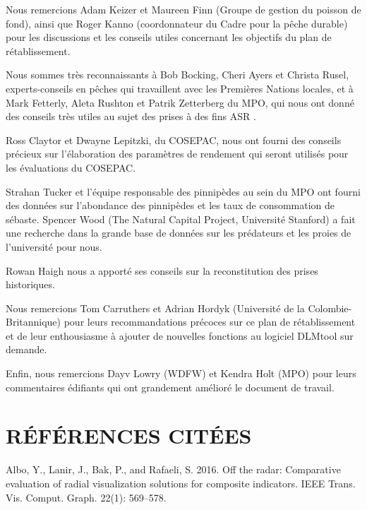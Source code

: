 \documentclass[11pt]{book}
\begin{document}
Nous remercions Adam Keizer et Maureen Finn (Groupe de gestion du poisson de fond), ainsi que Roger Kanno (coordonnateur du Cadre pour la pêche durable) pour les discussions et les conseils utiles concernant les objectifs du plan de rétablissement.

Nous sommes très reconnaissants à Bob Bocking, Cheri Ayers et Christa Rusel, experts-conseils en pêches qui travaillent avec les Premières Nations locales, et à Mark Fetterly, Aleta Rushton et Patrik Zetterberg du MPO, qui nous ont donné des conseils très utiles au sujet des prises à des fins ASR .

Ross Claytor et Dwayne Lepitzki, du COSEPAC, nous ont fourni des conseils précieux sur l'élaboration des paramètres de rendement qui seront utilisés pour les évaluations du COSEPAC.

Strahan Tucker et l'équipe responsable des pinnipèdes au sein du MPO ont fourni des données sur l'abondance des pinnipèdes et les taux de consommation de sébaste. Spencer Wood (The Natural Capital Project, Université Stanford) a fait une recherche dans la grande base de données sur les prédateurs et les proies de l'université pour nous.

Rowan Haigh nous a apporté ses conseils sur la reconstitution des prises historiques.

Nous remercions Tom Carruthers et Adrian Hordyk (Université de la Colombie-Britannique) pour leurs recommandations précoces sur ce plan de rétablissement et de leur enthousiasme à ajouter de nouvelles fonctions au logiciel DLMtool sur demande.

Enfin, nous remercions Dayv Lowry (WDFW) et Kendra Holt (MPO) pour leurs commentaires édifiants qui ont grandement amélioré le document de travail.

\clearpage

\hypertarget{ruxe9fuxe9rences-cituxe9es}{%
\section*{RÉFÉRENCES CITÉES}\label{ruxe9fuxe9rences-cituxe9es}}
\noindent
\vspace{-2em}
\setlength{\parindent}{-0.2in}
\setlength{\leftskip}{0.2in}
\setlength{\parskip}{8pt}

\hypertarget{refs}{}
\leavevmode\hypertarget{ref-albo2016}{}%
Albo, Y., Lanir, J., Bak, P., and Rafaeli, S. 2016. Off the radar: Comparative evaluation of radial visualization solutions for composite indicators. IEEE Trans. Vis. Comput. Graph. 22(1): 569--578.
\end{document}
